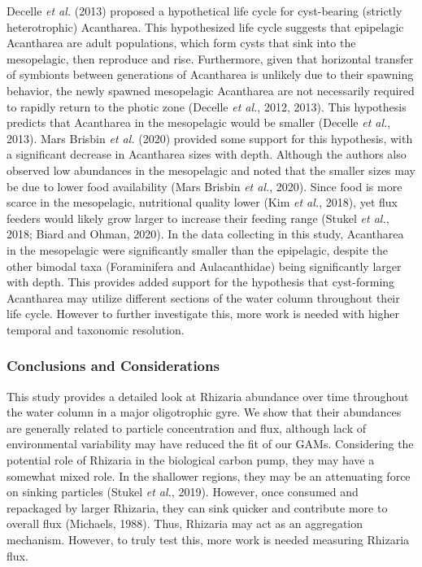 \documentclass[
]{article}
\begin{document}
Decelle \emph{et al.} (2013) proposed a hypothetical life cycle for
cyst-bearing (strictly heterotrophic) Acantharea. This hypothesized life
cycle suggests that epipelagic Acantharea are adult populations, which
form cysts that sink into the mesopelagic, then reproduce and rise.
Furthermore, given that horizontal transfer of symbionts between
generations of Acantharea is unlikely due to their spawning behavior,
the newly spawned mesopelagic Acantharea are not necessarily required to
rapidly return to the photic zone (Decelle \emph{et al.}, 2012, 2013).
This hypothesis predicts that Acantharea in the mesopelagic would be
smaller (Decelle \emph{et al.}, 2013). Mars Brisbin \emph{et al.} (2020)
provided some support for this hypothesis, with a significant decrease
in Acantharea sizes with depth. Although the authors also observed low
abundances in the mesopelagic and noted that the smaller sizes may be
due to lower food availability (Mars Brisbin \emph{et al.}, 2020). Since
food is more scarce in the mesopelagic, nutritional quality lower (Kim
\emph{et al.}, 2018), yet flux feeders would likely grow larger to
increase their feeding range (Stukel \emph{et al.}, 2018; Biard and
Ohman, 2020). In the data collecting in this study, Acantharea in the
mesopelagic were significantly smaller than the epipelagic, despite the
other bimodal taxa (Foraminifera and Aulacanthidae) being significantly
larger with depth. This provides added support for the hypothesis that
cyst-forming Acantharea may utilize different sections of the water
column throughout their life cycle. However to further investigate this,
more work is needed with higher temporal and taxonomic resolution.

\hypertarget{conclusions-and-considerations}{%
\subsubsection{Conclusions and
Considerations}\label{conclusions-and-considerations}}

This study provides a detailed look at Rhizaria abundance over time
throughout the water column in a major oligotrophic gyre. We show that
their abundances are generally related to particle concentration and
flux, although lack of environmental variability may have reduced the
fit of our GAMs. Considering the potential role of Rhizaria in the
biological carbon pump, they may have a somewhat mixed role. In the
shallower regions, they may be an attenuating force on sinking particles
(Stukel \emph{et al.}, 2019). However, once consumed and repackaged by
larger Rhizaria, they can sink quicker and contribute more to overall
flux (Michaels, 1988). Thus, Rhizaria may act as an aggregation
mechanism. However, to truly test this, more work is needed measuring
Rhizaria flux.
\end{document}
